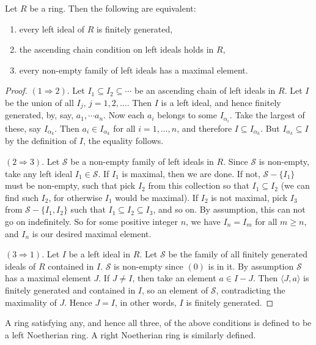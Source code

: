 \documentclass[12pt]{article}
\begin{document}
Let $R$ be a ring.  Then the following are equivalent:
\begin{enumerate}
\item every left ideal of $R$ is finitely generated,
\item the ascending chain condition on left ideals holds in $R$,
\item every non-empty family of left ideals has a maximal element.
\end{enumerate}
\begin{proof}

$(1\Rightarrow 2)$.  Let $I_1\subseteq I_2 \subseteq \cdots $ be an ascending chain of left ideals in $R$.  Let $I$ be the union of all $I_j$, $j=1,2,\ldots$. Then $I$ is a left ideal, and hence finitely generated, by, say, $a_1,\cdots a_n$.  Now each $a_i$ belongs to some $I_{\alpha_i}$.  Take the largest of these, say $I_{\alpha_k}$.  Then $a_i\in I_{\alpha_k}$ for all $i=1,\ldots, n$, and therefore $I\subseteq I_{\alpha_k}$.  But $I_{\alpha_k}\subseteq I$ by the definition of $I$,  the equality follows.

$(2\Rightarrow 3)$.  Let $\mathcal{S}$ be a non-empty family of left ideals in $R$.  Since $\mathcal{S}$ is non-empty, take any left ideal $I_1\in \mathcal{S}$.  If $I_1$ is maximal, then we are done.  If not, $\mathcal{S}-\lbrace I_1\rbrace$ must be non-empty, such that pick $I_2$ from this collection so that $I_1\subseteq I_2$ (we can find such $I_2$, for otherwise $I_1$ would be maximal).  If $I_2$ is not maximal, pick $I_3$ from $\mathcal{S}-\lbrace I_1, I_2\rbrace$ such that $I_1\subseteq I_2\subseteq I_3$, and so on.  By assumption, this can not go on indefinitely.  So for some positive integer $n$, we have $I_n=I_m$ for all $m\ge n$, and $I_n$ is our desired maximal element.

$(3\Rightarrow 1)$.  Let $I$ be a left ideal in $R$.  Let $\mathcal{S}$ be the family of all finitely generated ideals of $R$ contained in $I$.  $\mathcal{S}$ is non-empty since $(0)$ is in it.  By assumption $\mathcal{S}$ has a maximal element $J$.  If $J\ne I$, then take an element $a\in I-J$.  Then $\langle J,a\rangle$ is finitely generated and contained in $I$, so an element of $\mathcal{S}$, contradicting the maximality of $J$.  Hence $J=I$, in other words, $I$ is finitely generated.
\end{proof}

A ring satisfying any, and hence all three, of the above conditions is defined to be a left Noetherian ring.  A right Noetherian ring is similarly defined.
\end{document}
